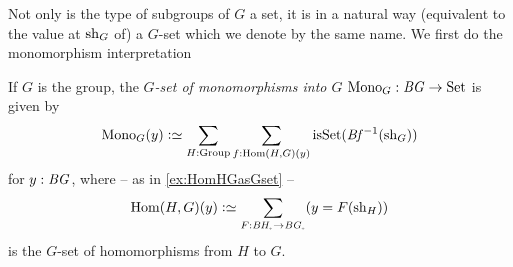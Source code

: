 Not only is the type of subgroups  of $G$ a set, it is in a natural way (equivalent to the value at $\mathrm{sh}_G$ of) a $G$-set which we denote by the same name.  We first do the monomorphism interpretation
\begin{definition}
  If $G$ is the group, the \emph{$G$-set of monomorphisms into $G$} $\mathrm{Mono}_G:\mathit{B}\mathit{G}\to\mathrm{Set}$ is given by
  $$%
  \typemono_G(y)\defequi \sum_{H:\typegroup}\sum_{f:\Hom(H,G)(y)}\isset(\Bf^{-1}(\sh_G))$$
  for $y:\mathit{B}\mathit{G}$, 
where  -- as in \cref{ex:HomHGasGset} -- 
$$\Hom(H,G)(y)\defequi\sum_{F:\BH_\div\to \BG_\div}(y=F(\sh_H))$$
is the $G$-set of homomorphisms from $H$ to $G$.
\end{definition}

